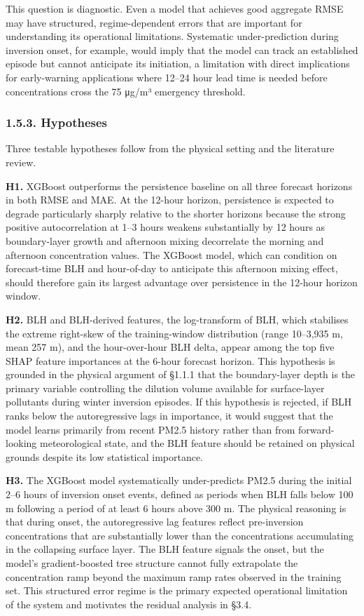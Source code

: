 This question is diagnostic. Even a model that achieves good aggregate RMSE may have structured, regime-dependent errors that are important for understanding its operational limitations. Systematic under-prediction during inversion onset, for example, would imply that the model can track an established episode but cannot anticipate its initiation, a limitation with direct implications for early-warning applications where 12--24 hour lead time is needed before concentrations cross the 75 μg/m³ emergency threshold.

\subsubsection{1.5.3. Hypotheses}\label{hypotheses}

Three testable hypotheses follow from the physical setting and the literature review.

\textbf{H1.} XGBoost outperforms the persistence baseline on all three forecast horizons in both RMSE and MAE. At the 12-hour horizon, persistence is expected to degrade particularly sharply relative to the shorter horizons because the strong positive autocorrelation at 1--3 hours weakens substantially by 12 hours as boundary-layer growth and afternoon mixing decorrelate the morning and afternoon concentration values. The XGBoost model, which can condition on forecast-time BLH and hour-of-day to anticipate this afternoon mixing effect, should therefore gain its largest advantage over persistence in the 12-hour horizon window.

\textbf{H2.} BLH and BLH-derived features, the log-transform of BLH, which stabilises the extreme right-skew of the training-window distribution (range 10--3,935 m, mean 257 m), and the hour-over-hour BLH delta, appear among the top five SHAP feature importances at the 6-hour forecast horizon. This hypothesis is grounded in the physical argument of §1.1.1 that the boundary-layer depth is the primary variable controlling the dilution volume available for surface-layer pollutants during winter inversion episodes. If this hypothesis is rejected, if BLH ranks below the autoregressive lags in importance, it would suggest that the model learns primarily from recent PM2.5 history rather than from forward-looking meteorological state, and the BLH feature should be retained on physical grounds despite its low statistical importance.

\textbf{H3.} The XGBoost model systematically under-predicts PM2.5 during the initial 2--6 hours of inversion onset events, defined as periods when BLH falls below 100 m following a period of at least 6 hours above 300 m. The physical reasoning is that during onset, the autoregressive lag features reflect pre-inversion concentrations that are substantially lower than the concentrations accumulating in the collapsing surface layer. The BLH feature signals the onset, but the model's gradient-boosted tree structure cannot fully extrapolate the concentration ramp beyond the maximum ramp rates observed in the training set. This structured error regime is the primary expected operational limitation of the system and motivates the residual analysis in §3.4.

